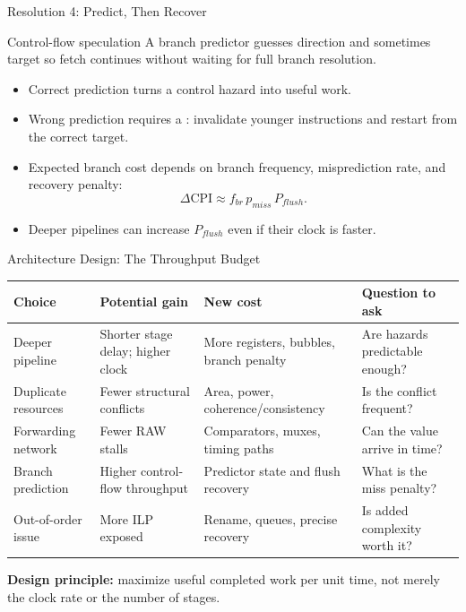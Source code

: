 \documentclass[aspectratio=169]{beamer}
\begin{document}
\begin{frame}{Resolution 4: Predict, Then Recover}
  \begin{block}{Control-flow speculation}
    A branch predictor guesses direction and sometimes target so fetch continues
    without waiting for full branch resolution.
  \end{block}
  \begin{itemize}
    \item Correct prediction turns a control hazard into useful work.
    \item Wrong prediction requires a : invalidate younger
      instructions and restart from the correct target.
    \item Expected branch cost depends on branch frequency, misprediction rate,
      and recovery penalty:
      \[
        \Delta\mathrm{CPI}\approx f_{br}\,p_{miss}\,P_{flush}.
      \]
    \item Deeper pipelines can increase $P_{flush}$ even if their clock is faster.
  \end{itemize}
\end{frame}

\begin{frame}{Architecture Design: The Throughput Budget}
  \scriptsize
  \begin{center}
    \begin{tabular}{@{}p{2.8cm}p{3.2cm}p{3.2cm}p{3.0cm}@{}}
      \toprule
      \textbf{Choice} & \textbf{Potential gain} & \textbf{New cost} & \textbf{Question to ask} \\
      \midrule
      Deeper pipeline & Shorter stage delay; higher clock & More registers, bubbles, branch penalty & Are hazards predictable enough? \\
      Duplicate resources & Fewer structural conflicts & Area, power, coherence/consistency & Is the conflict frequent? \\
      Forwarding network & Fewer RAW stalls & Comparators, muxes, timing paths & Can the value arrive in time? \\
      Branch prediction & Higher control-flow throughput & Predictor state and flush recovery & What is the miss penalty? \\
      Out-of-order issue & More ILP exposed & Rename, queues, precise recovery & Is added complexity worth it? \\
      \bottomrule
    \end{tabular}
  \end{center}
  \vspace{0.1cm}
  \textbf{Design principle:} maximize useful completed work per unit time, not
  merely the clock rate or the number of stages.
\end{frame}
\end{document}
